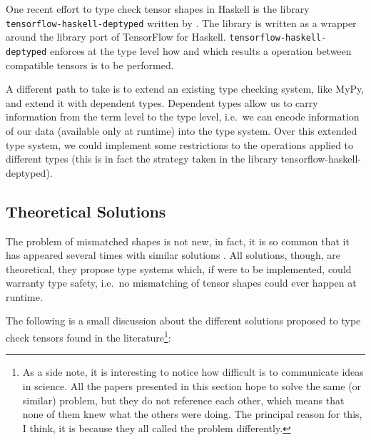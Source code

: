 \documentclass[
11pt, %
english, %
singlespacing, %
headsepline, %
]{MastersDoctoralThesis} %
\begin{document}
One recent effort to type check tensor shapes in Haskell is the library
\texttt{tensorflow-haskell-deptyped} written by
\textcite{elkin_haskell_2018}. The library is written as a wrapper
around the library port of TensorFlow for Haskell.
\texttt{tensorflow-haskell-deptyped} enforces at the type level how and
which results a operation between compatible tensors is to be performed.

A different path to take is to extend an existing type checking system,
like MyPy, and extend it with dependent types. Dependent types allow us
to carry information from the term level to the type level, i.e.~we can
encode information of our data (available only at runtime) into the type
system. Over this extended type system, we could implement some
restrictions to the operations applied to different types (this is in
fact the strategy taken in the library tensorflow-haskell-deptyped).

\hypertarget{theoretical-solutions}{%
\subsection{Theoretical Solutions}\label{theoretical-solutions}}

The problem of mismatched shapes is not new, in fact, it is so common
that it has appeared several times with similar solutions
\autocites{arnold_specifying_2010}{griffioen_type_2015}{rink_modeling_2018}{slepak_array-oriented_2014}{trojahner_dependently_2009}.
All solutions, though, are theoretical, they propose type systems which,
if were to be implemented, could warranty type safety, i.e.~no
mismatching of tensor shapes could ever happen at runtime.

The following is a small discussion about the different solutions
proposed to type check tensors found in the literature\footnote{As a
  side note, it is interesting to notice how difficult is to communicate
  ideas in science. All the papers presented in this section hope to
  solve the same (or similar) problem, but they do not reference each
  other, which means that none of them knew what the others were doing.
  The principal reason for this, I think, it is because they all called
  the problem differently.}:
\end{document}
